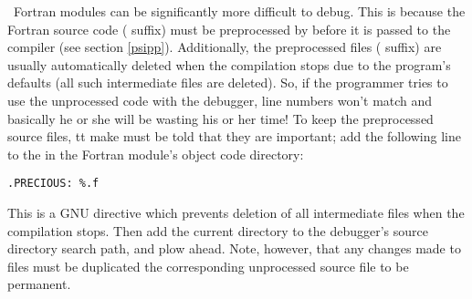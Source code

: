 \PSIthree\ Fortran modules can be significantly more difficult to debug.  This is
because the Fortran source code ( suffix) must be preprocessed by
 before it is passed to the compiler (see section \ref{psipp}).
Additionally, the preprocessed files ( suffix) are usually
automatically deleted when the compilation stops due to the 
program's defaults (all such intermediate files are deleted).  So, if the
programmer tries to use the unprocessed code with the debugger, line
numbers won't match and basically he or she will be wasting his or her
time!  To keep the preprocessed source files, {tt make} must be told that
they are important; add the following line to the  in the
Fortran module's object code directory:
\begin{verbatim}
.PRECIOUS: %.f
\end{verbatim}
This is a GNU  directive which prevents deletion of all
intermediate  files when the compilation stops.  Then add the
current directory to the debugger's source directory search path, and plow
ahead.  Note, however, that any changes made to  files must be
duplicated the corresponding unprocessed source file to be permanent.
